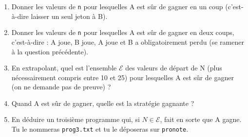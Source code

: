 \documentclass[a4paper,12pt]{book}
\begin{document}
\begin{enumerate}[\bfseries 1.]
	\item 	Donner les valeurs de \texttt{n} pour lesquelles A est sûr de gagner en un coup (c'est-à-dire laisser un seul jeton à B).
	\item 	Donner les valeurs de \texttt{n} pour lesquelles A est sûr de gagner en deux coups, c'est-à-dire : A joue, B joue, A joue et B a obligatoirement perdu (se ramener à la question précédente).
	\item 	En extrapolant, quel est l'ensemble $\mathcal{E}$ des valeurs de départ de N  (plus nécessairement compris entre 10 et 25) pour lesquelles A est sûr de gagner  (on ne demande pas de preuve) ?
	\item 	Quand A est sûr de gagner, quelle est la stratégie gagnante ?
	\item 	En déduire un troisième programme qui, si $N\in\mathcal{E}$, fait en sorte que A gagne. Tu le nommeras \texttt{prog3.txt} et tu le déposeras sur \texttt{pronote}.
\end{enumerate}
\end{document}
